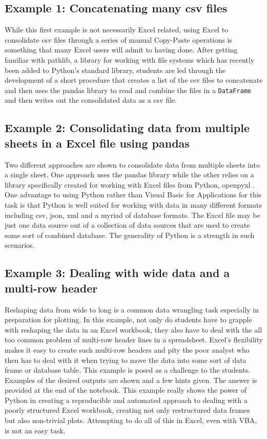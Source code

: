 \documentclass[ited,blindrev]{informs3}              %
\newcommand{\code}[1]{\texttt{#1}}
\begin{document}
\subsection{Example 1: Concatenating many csv files}

While this first example is not necessarily Excel related, using Excel to consolidate csv files through a series of manual Copy-Paste operations is something that many Excel users will admit to having done. After getting familiar with pathlib, a library for working with file systems which has recently been added to Python's standard library, students are led through the development of a short procedure that creates a list of the csv files to concatenate and then uses the pandas library to read and combine the files in a \code{DataFrame} and then writes out the consolidated data as a csv file.

\subsection{Example 2: Consolidating data from multiple sheets in a Excel file using pandas}

Two different approaches are shown to consolidate data from multiple sheets into a single sheet. One approach uses the pandas library while the other relies on a library specifically created for working with Excel files from Python, openpyxl \cite{bibid}. One advantage to using Python rather than Visual Basic for Applications for this task is that Python is well suited for working with data in many different formats including csv, json, xml and a myriad of database formats. The Excel file may be just one data source out of a collection of data sources that are used to create some sort of combined database. The generality of Python is a strength in such scenarios.

\subsection{Example 3: Dealing with wide data and a multi-row header}

Reshaping data \cite{bibid} from wide to long is a common data wrangling task especially in preparation for plotting. In this example, not only do students have to grapple with reshaping the data in an Excel workbook, they also have to deal with the all too common problem of multi-row header lines in a spreadsheet. Excel's flexibility makes it easy to create such multi-row headers and pity the poor analyst who then has to deal with it when trying to move the data into some sort of data frame or database table. This example is posed as a challenge to the students. Examples of the desired outputs are shown and a few hints given. The answer is provided at the end of the notebook. This example really shows the power of Python in creating a reproducible and automated approach to dealing with a poorly structured Excel workbook, creating not only restructured data frames but also non-trivial plots. Attempting to do all of this in Excel, even with VBA, is not an easy task.
\end{document}
